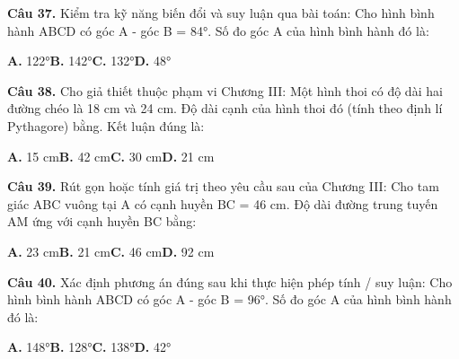 \documentclass[11pt,a4paper]{article}
\begin{document}
\textbf{\color{primary} Câu 37.} Kiểm tra kỹ năng biến đổi và suy luận qua bài toán: Cho hình bình hành ABCD có góc A - góc B = 84°. Số đo góc A của hình bình hành đó là:\par
\hspace*{1.5em}\textbf{A.} 122°\quad\quad \textbf{B.} 142°\quad\quad \textbf{C.} 132°\quad\quad \textbf{D.} 48°\par\vspace{2pt}
\textbf{\color{primary} Câu 38.} Cho giả thiết thuộc phạm vi Chương III: Một hình thoi có độ dài hai đường chéo là 18 cm và 24 cm. Độ dài cạnh của hình thoi đó (tính theo định lí Pythagore) bằng. Kết luận đúng là:\par
\hspace*{1.5em}\textbf{A.} 15 cm\quad\quad \textbf{B.} 42 cm\quad\quad \textbf{C.} 30 cm\quad\quad \textbf{D.} 21 cm\par\vspace{2pt}
\textbf{\color{primary} Câu 39.} Rút gọn hoặc tính giá trị theo yêu cầu sau của Chương III: Cho tam giác ABC vuông tại A có cạnh huyền BC = 46 cm. Độ dài đường trung tuyến AM ứng với cạnh huyền BC bằng:\par
\hspace*{1.5em}\textbf{A.} 23 cm\quad\quad \textbf{B.} 21 cm\quad\quad \textbf{C.} 46 cm\quad\quad \textbf{D.} 92 cm\par\vspace{2pt}
\textbf{\color{primary} Câu 40.} Xác định phương án đúng sau khi thực hiện phép tính / suy luận: Cho hình bình hành ABCD có góc A - góc B = 96°. Số đo góc A của hình bình hành đó là:\par
\hspace*{1.5em}\textbf{A.} 148°\quad\quad \textbf{B.} 128°\quad\quad \textbf{C.} 138°\quad\quad \textbf{D.} 42°\par\vspace{2pt}
\end{document}
